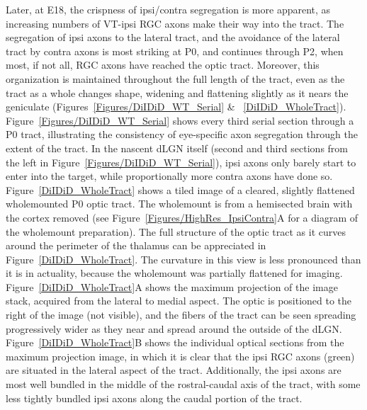 Later, at E18, the crispness of ipsi/contra segregation is more apparent, as increasing numbers of VT-ipsi RGC axons make their way into the tract.
The segregation of ipsi axons to the lateral tract, and the avoidance of the lateral tract by contra axons is most striking at P0, and continues through P2, when most, if not all, RGC axons have reached the optic tract.
Moreover, this organization is maintained throughout the full length of the tract, even as the tract as a whole changes shape, widening and flattening slightly as it nears the geniculate (Figures~\ref{Figures/DiIDiD_WT_Serial} \& ~\ref{DiIDiD_WholeTract}).
Figure~\ref{Figures/DiIDiD_WT_Serial} shows every third serial section through a P0 tract, illustrating the consistency of eye-specific axon segregation through the extent of the tract.
In the nascent dLGN itself (second and third sections from the left in Figure~\ref{Figures/DiIDiD_WT_Serial}), ipsi axons only barely start to enter into the target, while proportionally more contra axons have done so.
Figure~\ref{DiIDiD_WholeTract} shows a tiled image of a cleared, slightly flattened wholemounted P0 optic tract.
The wholemount is from a hemisected brain with the cortex removed (see Figure~\ref{Figures/HighRes_IpsiContra}A for a diagram of the wholemount preparation).
The full structure of the optic tract as it curves around the perimeter of the thalamus can be appreciated in Figure~\ref{DiIDiD_WholeTract}.
The curvature in this view is less pronounced than it is in actuality, because the wholemount was partially flattened for imaging.
Figure~\ref{DiIDiD_WholeTract}A shows the maximum projection of the image stack, acquired from the lateral to medial aspect.
The optic is positioned to the right of the image (not visible), and the fibers of the tract can be seen spreading progressively wider as they near and spread around the outside of the dLGN.
Figure~\ref{DiIDiD_WholeTract}B shows the individual optical sections from the maximum projection image, in which it is clear that the ipsi RGC axons (green) are situated in the lateral aspect of the tract.
Additionally, the ipsi axons are most well bundled in the middle of the rostral-caudal axis of the tract, with some less tightly bundled ipsi axons along the caudal portion of the tract.
